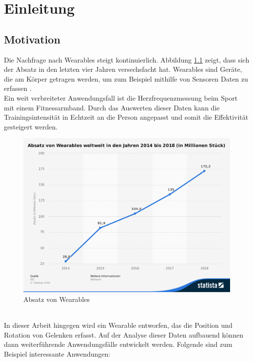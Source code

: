 \chapter{Einleitung}
\label{ch:introduction}

\section{Motivation}
Die Nachfrage nach Wearables steigt kontinuierlich.
Abbildung \ref{fig:stat_wearables} zeigt, dass sich der Absatz in den letzten vier Jahren versechsfacht hat.
Wearables sind Geräte, die am Körper getragen werden, um zum Beispiel mithilfe von Sensoren Daten zu erfassen \cite{definition_wearables}.\\
Ein weit verbreiteter Anwendungsfall ist die Herzfrequenzmessung beim Sport mit einem Fitnessarmband.
Durch das Auswerten dieser Daten kann die Trainingsintensität in Echtzeit an die Person angepasst und somit die Effektivität gesteigert werden.
\begin{figure}[hbtp]
	\centering
	\includegraphics[width=0.75\linewidth]{res/01_statistic_id515723_absatz-von-wearables-weltweit-bis-2018.png}
	\caption{Absatz von Wearables \cite{statistik_wearables}}
	\label{fig:stat_wearables}
\end{figure}\\
In dieser Arbeit hingegen wird ein Wearable entworfen, das die Position und Rotation von Gelenken erfasst.
Auf der Analyse dieser Daten aufbauend können dann weiterführende Anwendungsfälle entwickelt werden.
Folgende sind zum Beispiel interessante Anwendungen:
